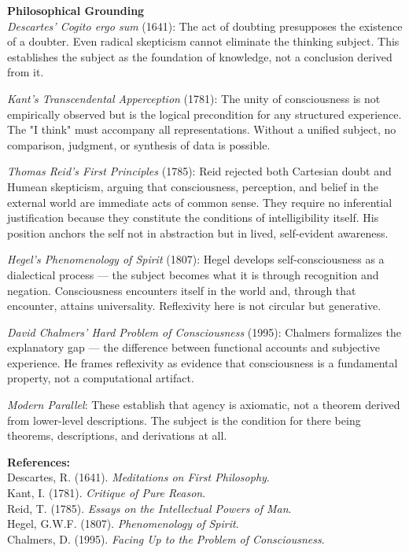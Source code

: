 \begin{technical}
\textbf{Philosophical Grounding}\\[0.1em]
\textit{Descartes' Cogito ergo sum} (1641): The act of doubting presupposes the existence of a doubter. Even radical skepticism cannot eliminate the thinking subject. This establishes the subject as the foundation of knowledge, not a conclusion derived from it.

\textit{Kant's Transcendental Apperception} (1781): The unity of consciousness is not empirically observed but is the logical precondition for any structured experience. The "I think" must accompany all representations. Without a unified subject, no comparison, judgment, or synthesis of data is possible.

\textit{Thomas Reid's First Principles} (1785): Reid rejected both Cartesian doubt and Humean skepticism, arguing that consciousness, perception, and belief in the external world are immediate acts of common sense. They require no inferential justification because they constitute the conditions of intelligibility itself. His position anchors the self not in abstraction but in lived, self-evident awareness.

\textit{Hegel's Phenomenology of Spirit} (1807): Hegel develops self-consciousness as a dialectical process — the subject becomes what it is through recognition and negation. Consciousness encounters itself in the world and, through that encounter, attains universality. Reflexivity here is not circular but generative.

\textit{David Chalmers' Hard Problem of Consciousness} (1995): Chalmers formalizes the explanatory gap — the difference between functional accounts and subjective experience. He frames reflexivity as evidence that consciousness is a fundamental property, not a computational artifact.

\textit{Modern Parallel}: These establish that agency is axiomatic, not a theorem derived from lower-level descriptions. The subject is the condition for there being theorems, descriptions, and derivations at all.

\vspace{0.2em}
\textbf{References:}\\
{\footnotesize
Descartes, R. (1641). \textit{Meditations on First Philosophy}.\\
Kant, I. (1781). \textit{Critique of Pure Reason}.\\
Reid, T. (1785). \textit{Essays on the Intellectual Powers of Man}.\\
Hegel, G.W.F. (1807). \textit{Phenomenology of Spirit}.\\
Chalmers, D. (1995). \textit{Facing Up to the Problem of Consciousness}.
}
\end{technical}